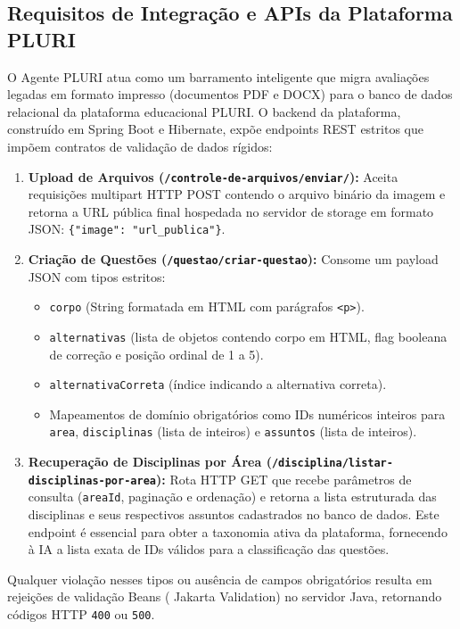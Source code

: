 \documentclass[sigconf]{acmart}
\begin{document}
\subsection{Requisitos de Integração e APIs da Plataforma PLURI}
O Agente PLURI atua como um barramento inteligente que migra avaliações legadas em formato impresso (documentos PDF e DOCX) para o banco de dados relacional da plataforma educacional PLURI. O backend da plataforma, construído em Spring Boot e Hibernate, expõe endpoints REST estritos que impõem contratos de validação de dados rígidos:
\begin{enumerate}
\item \textbf{Upload de Arquivos (\lstinline|/controle-de-arquivos/enviar/|):} Aceita requisições multipart HTTP POST contendo o arquivo binário da imagem e retorna a URL pública final hospedada no servidor de storage em formato JSON: \lstinline|{"image": "url_publica"}|.
\item \textbf{Criação de Questões (\lstinline{/questao/criar-questao}):} Consome um payload JSON com tipos estritos:
   \begin{itemize}
   \item \lstinline{corpo} (String formatada em HTML com parágrafos \lstinline{<p>}).
   \item \lstinline{alternativas} (lista de objetos contendo corpo em HTML, flag booleana de correção e posição ordinal de 1 a 5).
   \item \lstinline{alternativaCorreta} (índice indicando a alternativa correta).
   \item Mapeamentos de domínio obrigatórios como IDs numéricos inteiros para \lstinline{area}, \lstinline{disciplinas} (lista de inteiros) e \lstinline{assuntos} (lista de inteiros).
   \end{itemize}
\item \textbf{Recuperação de Disciplinas por Área (\lstinline|/disciplina/listar-disciplinas-por-area|):} Rota HTTP GET que recebe parâmetros de consulta (\lstinline{areaId}, paginação e ordenação) e retorna a lista estruturada das disciplinas e seus respectivos assuntos cadastrados no banco de dados. Este endpoint é essencial para obter a taxonomia ativa da plataforma, fornecendo à IA a lista exata de IDs válidos para a classificação das questões.
\end{enumerate}
Qualquer violação nesses tipos ou ausência de campos obrigatórios resulta em rejeições de validação Beans ( Jakarta Validation) no servidor Java, retornando códigos HTTP \lstinline{400} ou \lstinline{500}.
\end{document}
